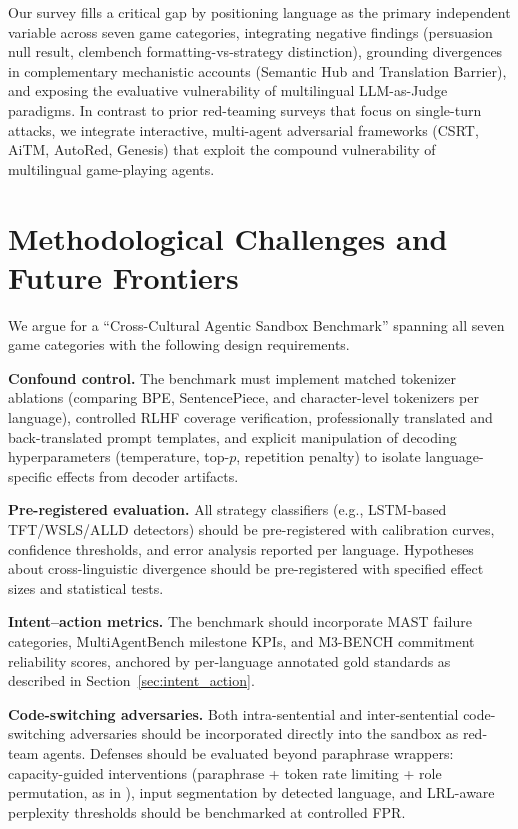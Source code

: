 \documentclass[11pt]{article}
\begin{document}
Our survey fills a critical gap by positioning language as the primary independent variable across seven game categories, integrating negative findings (persuasion null result, clembench formatting-vs-strategy distinction), grounding divergences in complementary mechanistic accounts (Semantic Hub and Translation Barrier), and exposing the evaluative vulnerability of multilingual LLM-as-Judge paradigms. In contrast to prior red-teaming surveys that focus on single-turn attacks, we integrate interactive, multi-agent adversarial frameworks (CSRT, AiTM, AutoRed, Genesis) that exploit the compound vulnerability of multilingual game-playing agents.

\section{Methodological Challenges and Future Frontiers}
\label{sec:future}

We argue for a ``Cross-Cultural Agentic Sandbox Benchmark'' spanning all seven game categories with the following design requirements.

\textbf{Confound control.} The benchmark must implement matched tokenizer ablations (comparing BPE, SentencePiece, and character-level tokenizers per language), controlled RLHF coverage verification, professionally translated and back-translated prompt templates, and explicit manipulation of decoding hyperparameters (temperature, top-$p$, repetition penalty) to isolate language-specific effects from decoder artifacts.

\textbf{Pre-registered evaluation.} All strategy classifiers (e.g., LSTM-based TFT/WSLS/ALLD detectors) should be pre-registered with calibration curves, confidence thresholds, and error analysis reported per language. Hypotheses about cross-linguistic divergence should be pre-registered with specified effect sizes and statistical tests.

\textbf{Intent--action metrics.} The benchmark should incorporate MAST failure categories, MultiAgentBench milestone KPIs, and M3-BENCH commitment reliability scores, anchored by per-language annotated gold standards as described in Section~\ref{sec:intent_action}.

\textbf{Code-switching adversaries.} Both intra-sentential and inter-sentential code-switching adversaries should be incorporated directly into the sandbox as red-team agents. Defenses should be evaluated beyond paraphrase wrappers: capacity-guided interventions (paraphrase + token rate limiting + role permutation, as in \citet{roger2025auditwhisper}), input segmentation by detected language, and LRL-aware perplexity thresholds should be benchmarked at controlled FPR.
\end{document}
